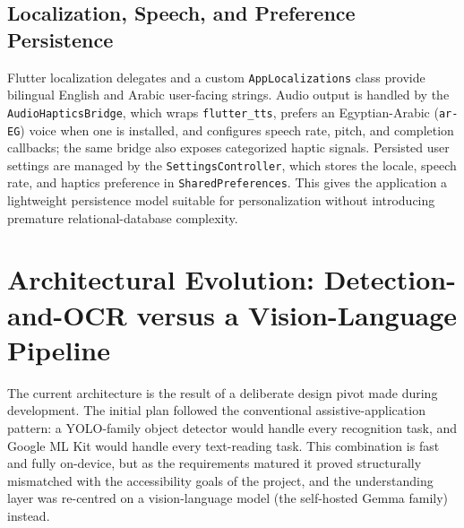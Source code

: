 \documentclass[a4paper]{report}
\begin{document}
\subsection{Localization, Speech, and Preference Persistence}
Flutter localization delegates and a custom \texttt{AppLocalizations} class provide bilingual English and Arabic user-facing strings. Audio output is handled by the \texttt{AudioHapticsBridge}, which wraps \texttt{flutter\_tts}, prefers an Egyptian-Arabic (\texttt{ar-EG}) voice when one is installed, and configures speech rate, pitch, and completion callbacks; the same bridge also exposes categorized haptic signals. Persisted user settings are managed by the \texttt{SettingsController}, which stores the locale, speech rate, and haptics preference in \texttt{SharedPreferences}. This gives the application a lightweight persistence model suitable for personalization without introducing premature relational-database complexity.

\section{Architectural Evolution: Detection-and-OCR versus a Vision-Language Pipeline}
The current architecture is the result of a deliberate design pivot made during development. The initial plan followed the conventional assistive-application pattern: a YOLO-family object detector would handle every recognition task, and Google ML Kit would handle every text-reading task. This combination is fast and fully on-device, but as the requirements matured it proved structurally mismatched with the accessibility goals of the project, and the understanding layer was re-centred on a vision-language model (the self-hosted Gemma family) instead.
\end{document}
